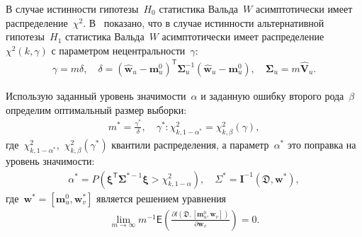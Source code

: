 В случае истинности гипотезы~$H_0$ статистика Вальда~$W$ асимптотически имеет распределение~$\chi^2$. В~\cite{shieh2005} показано, что в случае истинности альтернативной гипотезы~$H_1$ статистика Вальда~$W$ асимптотически имеет распределение~$\chi^2(k,\gamma)$ с параметром нецентральности~$\gamma$:
\[
\label{eq:sb:17}
\begin{aligned}
	\gamma = m\delta, \quad \delta = \left(\hat{\textbf{w}}_{u} - \textbf{m}_{u}^{0}\right)^{\mathsf{T}}\bm{\Sigma}^{-1}_u\left(\hat{\textbf{w}}_{u} - \textbf{m}_{u}^{0}\right), \quad \bm{\Sigma}_u = m\hat{\textbf{V}}_u.
\end{aligned}
\]

Использую заданный уровень значимости~$\alpha$ и заданную ошибку второго рода~$\beta$ определим оптимальный размер выборки:
\[
\label{eq:sb:18}
\begin{aligned}
	m^* = \frac{\gamma^*}{\delta}, \quad \gamma^*:\chi^2_{k, 1-\alpha^{*}} = \chi^2_{k, \beta}\left(\gamma\right),
\end{aligned}
\]
где~$\chi^2_{k, 1-\alpha^*}$,~$\chi^2_{k, \beta}\left(\gamma^*\right)$ квантили распределения, а параметр~$\alpha^*$ это поправка на уровень значимости:
\[
\label{eq:sb:19}
\begin{aligned}
	\alpha^* = P\left(\bm{\xi}^{\mathsf{T}}\bm{\Sigma}^{*-1} \bm{\xi} > \chi^2_{k,1 - \alpha}\right), \quad \Sigma^* = \textbf{I}^{-1}\left(\mathfrak{D}, \textbf{w}^*\right),
\end{aligned}
\]
где~$\textbf{w}^{*} = \left[\textbf{m}_{u}^{0}, \textbf{w}^{*}_v\right]$ является решением уравнения
\[
\label{eq:sb:20}
\begin{aligned}
	\lim_{m\to\infty}m^{-1}\mathsf{E}\left(\frac{\partial l\left(\mathfrak{D}, \left[ \textbf{m}_{u}^{0}, \textbf{w}_{v}\right]\right)}{\partial \textbf{w}_{v}}\right) = 0.
\end{aligned}
\]

